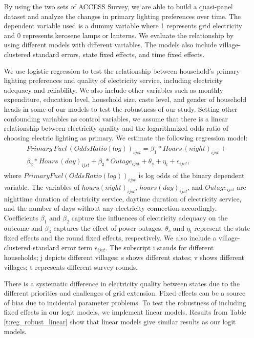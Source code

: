 \documentclass[11pt,english]{article}
\theoremstyle{plain} \newtheorem{claim}{Claim}
\theoremstyle{plain} \newtheorem{prop}{Proposition}
\theoremstyle{plain} \newtheorem{hypo}{Hypothesis}
\begin{document}
By using the two sets of ACCESS Survey, we are able to build a quasi-panel dataset and analyze the changes in primary lighting preferences over time. The dependent variable used is a dummy variable where 1 represents grid electricity and 0 represents kerosene lamps or lanterns. We evaluate the relationship by using different models with different variables. The models also include village-clustered standard errors, state fixed effects, and time fixed effects.

We use logistic regression to test the relationship between household$'$s primary lighting preferences and quality of electricity service, including electricity adequacy and reliability. We also include other variables such as monthly expenditure, education level, household size, caste level, and gender of household heads in some of our models to test the robustness of our study. Setting other confounding variables as control variables, we assume that there is a linear relationship between electricity quality and the logarithmized odds ratio of choosing electric lighting as primary. We estimate the following regression model:
\begin{align}
\begin{array}{c}
Primary\,Fuel\,(Odds Ratio (log))_{ijst} =\beta_{1}*Hours\,(night)_{ijst} +\\ \beta_{2}*Hours\,(day)_{ijst}+\beta_{3}*Outage_{ijst} + \theta_{s} +\eta_{t} + \epsilon_{ijvt},
\end{array}
\end{align}
where $Primary Fuel (Odds Ratio (log))_{ijst}$ is log odds of the binary dependent variable. The variables of $hours(night)_{ijst}$, $hours(day)_{ijst}$, and $Outage_{ijst}$ are nighttime duration of electricity service, daytime duration of electricity service, and the number of days without any electricity connection accordingly. Coefficients $\beta_{1}$ and $\beta_{2}$ capture the influences of electricity adequacy on the outcome and $\beta_{3}$ captures the effect of power outages. $\theta_{s}$ and $\eta_{t}$ represent the state fixed effects and the round fixed effects, respectively. We also include a village-clustered standard error term $\epsilon_{ijvt}$. The subscript i stands for different households; j depicts different villages; s shows different states; v shows different villages; t represents different survey rounds.

There is a systematic difference in electricity quality between states due to the different priorities and challenges of grid extension. Fixed effects can be a source of bias due to incidental parameter problems. To test the robustness of including fixed effects in our logit models, we implement linear models. Results from Table \ref{t:reg_robust_linear} show that linear models give similar results as our logit models.
\end{document}
